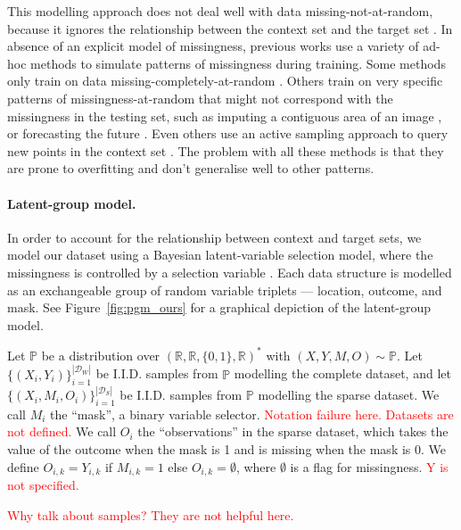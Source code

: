\documentclass[a4paper,12pt,twoside,openright]{report}
\newcommand{\crit}[1]{\textcolor{red}{#1}}
\begin{document}
This modelling approach does not deal well with data missing-not-at-random, because it ignores the relationship between the context set and the target set \parencite{duBayesianLatentVariable2022}. In absence of an explicit model of missingness, previous works use a variety of ad-hoc methods to simulate patterns of missingness during training. Some methods only train on data missing-completely-at-random \parencite{jafrastehGaussianProcessesMissing2022}. Others train on very specific patterns of missingness-at-random that might not correspond with the missingness in the testing set, such as imputing a contiguous area of an image \parencite{lugmayrRePaintInpaintingUsing2022}, or forecasting the future \parencite{zivotVectorAutoregressiveModels2003}. Even others use an active sampling approach to query new points in the context set \parencite{maEDDIEfficientDynamic2019}. The problem with all these methods is that they are prone to overfitting and don't generalise well to other patterns.

\paragraph{Latent-group model.} In order to account for the relationship between context and target sets, we model our dataset using a Bayesian latent-variable selection model, where the missingness is controlled by a selection variable \parencite{duBayesianLatentVariable2022, heckmanSampleSelectionBias1977}. Each data structure is modelled as an exchangeable group of random variable triplets --- location, outcome, and mask. See Figure~\ref{fig:pgm_ours} for a graphical depiction of the latent-group model.

Let $\mathbb{P}$ be a distribution over $(\mathbb{R}, \mathbb{R}, \{0,1\}, \mathbb{R})^*$ with $(X, Y, M, O) \sim \mathbb{P}$. Let $\{(X_i, Y_i)\}_{i=1}^{|\mathcal{D}_W|}$ be I.I.D. samples from $\mathbb{P}$ modelling the complete dataset, and let $\{(X_i, M_i, O_i)\}_{i=1}^{|\mathcal{D}_S|}$ be I.I.D. samples from $\mathbb{P}$ modelling the sparse dataset. We call $M_i$ the ``mask'', a binary variable selector. \crit{Notation failure here. Datasets are not defined.} We call $O_i$ the ``observations'' in the sparse dataset, which takes the value of the outcome when the mask is 1 and is missing when the mask is 0. We define $O_{i,k} = Y_{i,k}$ if $M_{i,k} = 1$ else $O_{i,k} = \emptyset$, where $\emptyset$ is a flag for missingness. \crit{Y is not specified.}

\crit{Why talk about samples? They are not helpful here.}
\end{document}
